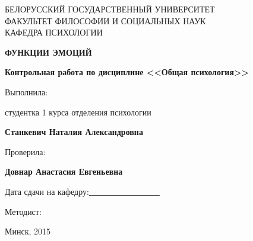 \documentclass{../../common/thesisbyxetex}
\begin{document}

\begin{titlepage}
\newpage

\begin{center}
\large \uppercase{Белорусский государственный университет \\
факультет философии и социальных наук\\
кафедра психологии}
\end{center}
 
\vspace{12em}



\begin{center}
\Large \uppercase{\textbf{Функции эмоций}}
\end{center}

\begin{center}
\textbf{Контрольная работа по дисциплине <<Общая психология>>}
\end{center}

\vspace{11em}
 
\begin{flushright}
Выполнила:

\vspace{0.25em}

студентка 1 курса отделения психологии

\textbf{Станкевич Наталия Александровна}

\vspace{2em}

Проверила:

\vspace{0.25em}

\textbf{Довнар Анастасия Евгеньевна}

\end{flushright}

\vspace{2em}
Дата сдачи на кафедру:\underline{~~~~~~~~~~~~~~~~~}
\vspace{0.25em}

Методист:
 
\vspace{\fill}

\begin{center}
Минск, 2015
\end{center}

\end{titlepage} 
\end{document}
